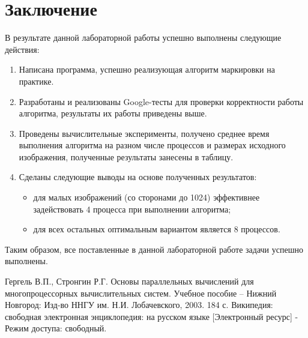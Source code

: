 \documentclass{report}
\begin{document}
\section*{Заключение}
В  результате  данной  лабораторной  работы  успешно  выполнены  следующие действия:
\begin{enumerate}

\item Написана программа, успешно реализующая алгоритм маркировки на практике. 
\item Разработаны  и  реализованы  Google-тесты  для  проверки  корректности работы алгоритма, результаты их работы приведены выше.
\item Проведены  вычислительные  эксперименты,  получено  среднее  время выполнения  алгоритма  на  разном  числе  процессов  и  размерах  исходного изображения, полученные результаты занесены в таблицу.
\item Сделаны следующие выводы на основе полученных результатов:
\begin{itemize}
\item для малых изображений (со сторонами до 1024) эффективнее задействовать 4 процесса при выполнении алгоритма;
\item для всех остальных оптимальным вариантом является 8 процессов. 
\end{itemize}
\end{enumerate}
Таким образом, все поставленные в данной лабораторной работе задачи успешно выполнены.   
\newpage

\begin{thebibliography}{1}
Гергель  В.П.,  Стронгин  Р.Г.  Основы  параллельных  вычислений  для многопроцессорных вычислительных систем. Учебное пособие  –  Нижний Новгород: Изд-во ННГУ им. Н.И. Лобачевского, 2003. 184 с.
Википедия:  свободная  электронная  энциклопедия:  на  русском  языке  [Электронный ресурс]  -  Режим  доступа: свободный.
\end{thebibliography}
\newpage

\end{document}
